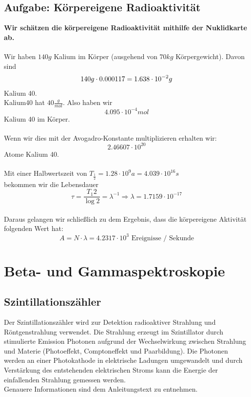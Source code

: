 \documentclass{article}
\begin{document}
\subsection{Aufgabe: Körpereigene Radioaktivität}
\textbf{Wir schätzen die körpereigene Radioaktivität mithilfe der Nuklidkarte ab.}\\
\\
Wir haben $140g$ Kalium im Körper (ausgehend von $70kg$ Körpergewicht).
Davon sind
$$
140g\cdot 0.000117=1.638\cdot10^{-2}g \\
$$
Kalium 40.\\
Kalium40 hat $40\frac{g}{mol}$. Also haben wir \\
$$4.095\cdot10^{-4}mol$$ Kalium 40 im Körper.\\
\\
Wenn wir dies mit der Avogadro-Konstante multiplizieren erhalten wir:\\
$$2.46607\cdot 10^{20}$$ Atome Kalium 40.\\
\\
Mit einer Halbwertszeit von $T_{\frac{1}{2}}= 1.28 \cdot 10^{9}a=4.039\cdot 10^{16}s$ \\
bekommen wir die Lebensdauer $$\tau=\frac{T_{1}{2}}{\log{2}}=\lambda^{-1} \Rightarrow \lambda=1.7159 \cdot 10^{-17}$$
\\
Daraus gelangen wir schließlich zu dem Ergebnis, dass die körpereigene Aktivität folgenden Wert hat:
$$\boxed{A=N\cdot \lambda = 4.2317\cdot 10^{3} \textrm{ Ereignisse / Sekunde}}$$

\newpage
\section{Beta- und Gammaspektroskopie}

\subsection{Szintillationszähler}
Der Szintillationszähler wird zur Detektion radioaktiver Strahlung und Röntgenstrahlung verwendet. Die Strahlung erzeugt im Szintillator durch stimulierte Emission Photonen aufgrund der Wechselwirkung zwischen Strahlung und Materie (Photoeffekt, Comptoneffekt und Paarbildung). Die Photonen werden an einer Photokathode in elektrische Ladungen umgewandelt und durch Verstärkung des entstehenden elektrischen Stroms kann die Energie der einfallenden Strahlung gemessen werden.\\
Genauere Informationen sind dem Anleitungstext zu entnehmen.
\end{document}

